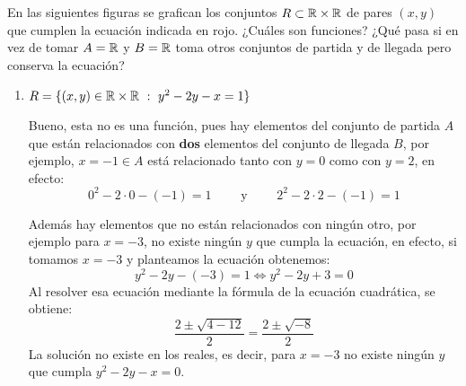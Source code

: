 \vspace{.2cm}

\begin{ejercicio}\label{reales12}
En las siguientes figuras se grafican los conjuntos $R\subset \mathbb{R}\times\mathbb{R}$ de pares $(x,y)$ que cumplen la ecuación indicada en rojo.
¿Cuáles son funciones?
¿Qué pasa si en vez de tomar $A=\mathbb{R}$ y $B=\mathbb{R}$ toma otros conjuntos de partida y de llegada pero conserva la ecuación?
\begin{center}
\end{center}
  \begin{enumerate}
  \item[1)] $R=\{(x,y)\in\R\times\R\ :\ y^2-2y-x=1\}$

    Bueno, esta no es una función, pues hay elementos del conjunto de partida $A$ que están relacionados con {\bf dos} elementos del conjunto de llegada $B$, por ejemplo,  $x=-1\in A$ está relacionado tanto con $y=0$ como con $y=2$, en efecto:
    $$0^2-2\cdot 0-(-1)=1\qquad\textrm{ y }\qquad 2^2-2\cdot 2-(-1)=1$$
    
    Además hay elementos que no están relacionados con ningún otro, por ejemplo para $x=-3$, no existe ningún $y$ que cumpla la ecuación, en efecto, si tomamos $x=-3$ y planteamos la ecuación obtenemos:
    $$y^2-2y-(-3)=1 \Leftrightarrow y^2-2y+3=0$$
    Al resolver esa ecuación mediante la fórmula de la ecuación cuadrática, se obtiene:
    $$\frac{2\pm\sqrt{4-12}}{2}=\frac{2\pm\sqrt{-8}}{2}$$
    La solución no existe en los reales, es decir, para $x=-3$ no existe ningún $y$ que cumpla $y^2-2y-x=0$.
    

\end{enumerate}
\end{ejercicio}
